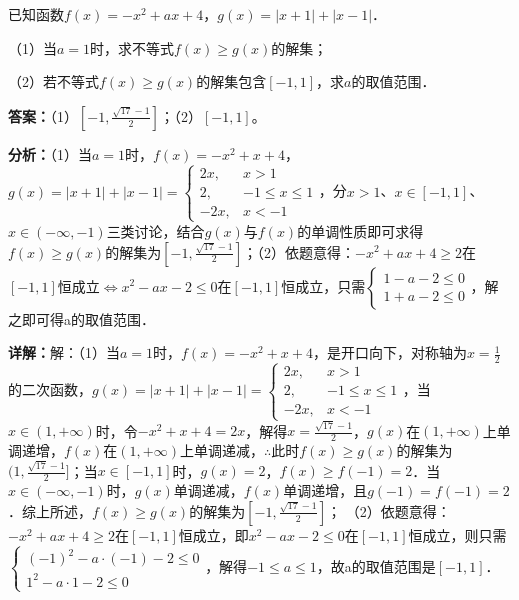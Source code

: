 \begin{question}[points=10]
已知函数$f(x)=-x^2+ax+4$，$g(x)=|x+1|+|x-1|$．

（1）当$a=1$时，求不等式$f(x)\ge g(x)$的解集；

（2）若不等式$f(x)\ge g(x)$的解集包含$[-1,1]$，求$a$的取值范围．
\begin{solution}
\textbf{答案：}（1）$[-1,\frac{\sqrt{17}-1}{2}]$；（2）$[-1,1]$。

\textbf{分析：}（1）当$a=1$时，$f(x)=-x^2+x+4$，$g(x)=|x+1|+|x-1|=\begin{cases} 2x, & x>1 \\ 2, & -1\le x\le 1 \\ -2x, & x<-1 \end{cases}$，分$x>1$、$x\in[-1,1]$、$x\in(-\infty,-1)$三类讨论，结合$g(x)$与$f(x)$的单调性质即可求得$f(x)\ge g(x)$的解集为$[-1,\frac{\sqrt{17}-1}{2}]$；（2）依题意得：$-x^2+ax+4\ge2$在$[-1,1]$恒成立$\Leftrightarrow x^2-ax-2\le0$在$[-1,1]$恒成立，只需$\begin{cases} 1-a-2\le0 \\ 1+a-2\le0 \end{cases}$，解之即可得a的取值范围．

\textbf{详解：}解：（1）当$a=1$时，$f(x)=-x^2+x+4$，是开口向下，对称轴为$x=\frac{1}{2}$的二次函数，$g(x)=|x+1|+|x-1|=\begin{cases} 2x, & x>1 \\ 2, & -1\le x\le 1 \\ -2x, & x<-1 \end{cases}$，当$x\in(1,+\infty)$时，令$-x^2+x+4=2x$，解得$x=\frac{\sqrt{17}-1}{2}$，$g(x)$在$(1,+\infty)$上单调递增，$f(x)$在$(1,+\infty)$上单调递减，$\therefore$此时$f(x)\ge g(x)$的解集为$(1,\frac{\sqrt{17}-1}{2}]$；当$x\in[-1,1]$时，$g(x)=2$，$f(x)\ge f(-1)=2$．当$x\in(-\infty,-1)$时，$g(x)$单调递减，$f(x)$单调递增，且$g(-1)=f(-1)=2$．综上所述，$f(x)\ge g(x)$的解集为$[-1,\frac{\sqrt{17}-1}{2}]$；
（2）依题意得：$-x^2+ax+4\ge2$在$[-1,1]$恒成立，即$x^2-ax-2\le0$在$[-1,1]$恒成立，则只需$\begin{cases} (-1)^2-a\cdot(-1)-2\le0 \\ 1^2-a\cdot1-2\le0 \end{cases}$，解得$-1\le a\le1$，故a的取值范围是$[-1,1]$．
\end{solution}
\end{question}

